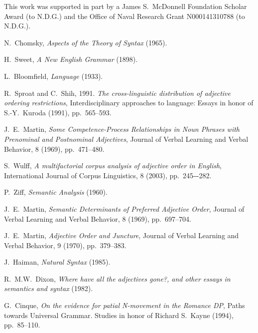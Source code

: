 \documentclass{pnastwo}
\begin{document}
\begin{article}
\begin{materials}
\end{materials}


\begin{acknowledgments}
This work was supported in part by a James S.~McDonnell Foundation Scholar Award (to N.D.G.) and the Office of Naval Research Grant N000141310788 (to N.D.G.).
\end{acknowledgments}

\begin{thebibliography}{10}
	N.~Chomsky, {\em Aspects of the Theory of Syntax} (1965).

	H.~Sweet, {\em A New English Grammar} (1898).
	
	L.~Bloomfield, {\em Language} (1933).
	
	R.~Sproat and C.~Shih, 1991. {\em The cross-linguistic distribution of adjective ordering restrictions}, Interdisciplinary approaches to language: Essays in honor of S.-Y.~Kuroda (1991), pp.~565--593.
	
	J.~E.~Martin, {\em Some Competence-Process Relationships in Noun Phrases with Prenominal and Postnominal Adjectives}, Journal of Verbal Learning and Verbal Behavior, 8 (1969), pp.~471--480. 	
	
	S.~Wulff, {\em A multifactorial corpus analysis of adjective order in English},
	International Journal of Corpus Linguistics, 8 (2003), pp.~245‒-282.
	
	P.~Ziff, {\em Semantic Analysis} (1960).
	
	J.~E.~Martin, {\em Semantic Determinants of Preferred Adjective Order}, Journal of Verbal Learning and Verbal Behavior, 8 (1969), pp.~697--704. 
	
	J.~E.~Martin, {\em Adjective Order and Juncture}, Journal of Verbal Learning and Verbal Behavior, 9 (1970), pp.~379--383. 
	
	J.~Haiman, {\em Natural Syntax} (1985).
	
	R.~M.W.~Dixon, {\em Where have all the adjectives gone?, and other essays in semantics and syntax} (1982).
	
	G.~Cinque, {\em On the evidence for patial N-movement in the Romance DP}, Paths towards Universal Grammar. Studies in honor of Richard S.~Kayne (1994), pp.~85--110.
	

\end{thebibliography}
\end{article}
\end{document}
